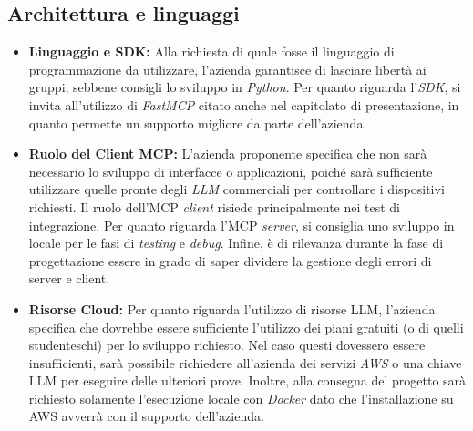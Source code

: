 \documentclass[11pt, a4paper]{article}
\begin{document}
\subsection{ Architettura e linguaggi}
\begin{itemize}
    \item \textbf{Linguaggio e SDK:} Alla richiesta di quale fosse il linguaggio di programmazione da utilizzare, l'azienda garantisce di lasciare libertà ai gruppi, sebbene consigli lo sviluppo in \textit{Python}. Per quanto riguarda l'\textit{SDK}, si invita all'utilizzo di \textit{FastMCP} citato anche nel capitolato di presentazione, in quanto permette un supporto migliore da parte dell'azienda. 

    \item \textbf{Ruolo del Client MCP:} L'azienda proponente specifica che non sarà necessario lo sviluppo di interfacce o applicazioni, poiché sarà sufficiente utilizzare quelle pronte degli \textit{LLM} commerciali per controllare i dispositivi richiesti. Il ruolo dell'MCP \textit{client} risiede principalmente nei test di integrazione. Per quanto riguarda l'MCP \textit{server}, si consiglia uno sviluppo in locale per le fasi di \textit{testing} e \textit{debug}. Infine, è di rilevanza durante la fase di progettazione essere in grado di saper dividere la gestione degli errori di server e client.
    
    \item \textbf{Risorse Cloud:} Per quanto riguarda l'utilizzo di risorse LLM, l'azienda specifica che dovrebbe essere sufficiente l'utilizzo dei piani gratuiti (o di quelli studenteschi) per lo sviluppo richiesto. Nel caso questi dovessero essere insufficienti, sarà possibile richiedere all'azienda dei servizi \textit{AWS} o una chiave LLM per eseguire delle ulteriori prove. Inoltre, alla consegna del progetto sarà richiesto solamente l'esecuzione locale con \textit{Docker} dato che l'installazione su AWS avverrà con il supporto dell'azienda.
    
\end{itemize}
\end{document}
